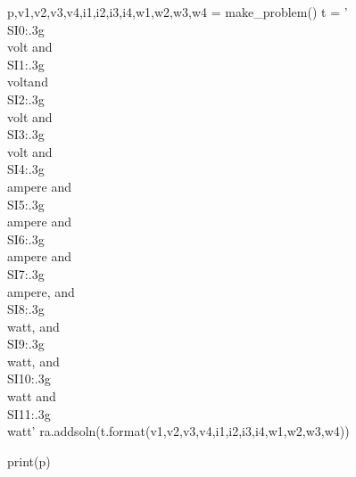 \documentclass[12pt]{exam}
\begin{document}
\begin{questions}
\begin{pycode}
p,v1,v2,v3,v4,i1,i2,i3,i4,w1,w2,w3,w4 = make_problem()
t = '\\SI{{{0:.3g}}}{{\\volt}} and \\SI{{{1:.3g}}}{{\\volt}}and \\SI{{{2:.3g}}}{{\\volt}} and \\SI{{{3:.3g}}}{{\\volt}} and \\SI{{{4:.3g}}}{{\\ampere}} and \\SI{{{5:.3g}}}{{\\ampere}} and \\SI{{{6:.3g}}}{{\\ampere}} and \\SI{{{7:.3g}}}{{\\ampere}}, and \\SI{{{8:.3g}}}{{\\watt}}, and \\SI{{{9:.3g}}}{{\\watt}}, and \\SI{{{10:.3g}}}{{\\watt}} and \\SI{{{11:.3g}}}{{\\watt}}'
ra.addsoln(t.format(v1,v2,v3,v4,i1,i2,i3,i4,w1,w2,w3,w4))

print(p)

\end{pycode}



\end{questions}
	
\end{document}
